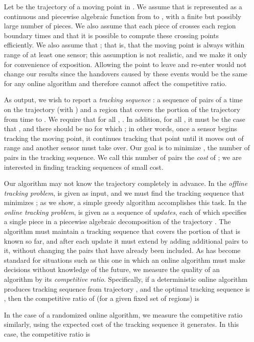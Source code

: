 \documentclass[runningheads]{llncs}
\begin{document}
Let  be the trajectory of a moving point in . We assume that  is represented as a continuous and piecewise algebraic function from  to , with a finite but possibly large number of pieces. We also assume that each piece of  crosses each region boundary  times and that it is possible to compute these crossing points efficiently. We also assume that ; that is, that the moving point is always within range of at least one sensor; this assumption is not realistic, and we make it only for convenience of exposition. Allowing the point to leave and re-enter  would not change our results since the handovers caused by these events would be the same for any online algorithm and therefore cannot affect the competitive ratio.

As output, we wish to report a \emph{tracking sequence} : a sequence of pairs  of a time  on the trajectory (with ) and a region  that covers the portion of the trajectory from time  to . We require that for all , . In addition, for all , it must be the case that , and there should be no  for which ; in other words, once a sensor begins tracking the moving point, it continues tracking that point until it moves out of range and another sensor must take over.  Our goal is to minimize , the number of pairs in the tracking sequence. We call this number of pairs the \emph{cost} of ; we are interested in finding tracking sequences of small cost.

Our algorithm may not know the trajectory  completely in advance. In the \emph{offline tracking problem},  is given as input, and we must find the tracking sequence  that minimizes ; as we show, a simple greedy algorithm accomplishes this task. In the \emph{online tracking problem},  is given as a sequence of \emph{updates}, each of which specifies a single piece in a piecewise algebraic decomposition of the trajectory . The algorithm must maintain a tracking sequence  that covers the portion of  that is known so far, and after each update it must extend  by adding additional pairs to it, without changing the pairs that have already been included. As has become standard for situations such as this one in which an online algorithm must make decisions without knowledge of the future, we measure the quality of an algorithm by its \emph{competitive ratio}. Specifically, if a deterministic online algorithm  produces tracking sequence  from trajectory , and the optimal tracking sequence is , then the competitive ratio of  (for a given fixed set  of regions) is

In the case of a randomized online algorithm, we measure the competitive ratio similarly, using the expected cost of the tracking sequence it generates. In this case, the competitive ratio is
\end{document}
